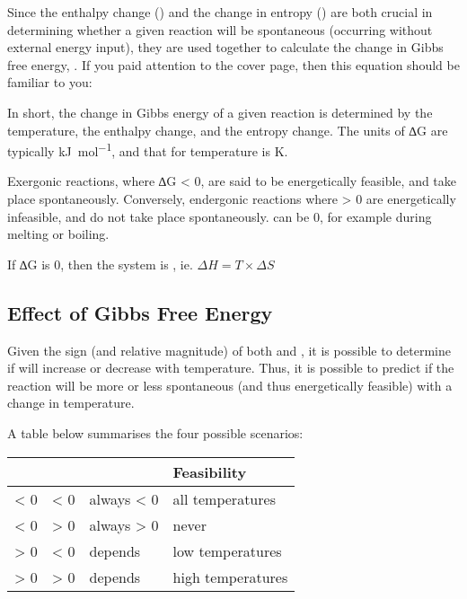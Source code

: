		Since the enthalpy change (\enth{}) and the change in entropy (\entr{}) are both crucial in determining whether a given reaction will
		be spontaneous (occurring without external energy input), they are used together to calculate the change in Gibbs free energy, \gibb{}.
		If you paid attention to the cover page, then this equation should be familiar to you:

		\mathdiagram{
			\[ \Delta G = \Delta H - T\times \Delta S \]
		}

		In short, the change in Gibbs energy of a given reaction is determined by the temperature, the enthalpy change, and the entropy change.
		The units of ∆G are typically \si{\kilo\joule\per\mole}, and that for temperature is \si{\kelvin}.

		Exergonic reactions, where ∆G < 0, are said to be energetically feasible, and take place spontaneously. Conversely, endergonic
		reactions where \gibb{} > 0 are energetically infeasible, and do not take place spontaneously. \gibb{} can be 0, for example during
		melting or boiling.

		If ∆G is 0, then the system is , ie. $\Delta H = T\times \Delta S$

		\subsection{Effect of Gibbs Free Energy}

			Given the sign (and relative magnitude) of both \enth{} and \entr{}, it is possible to determine if \gibb{} will increase or
			decrease with temperature. Thus, it is possible to predict if the reaction will be more or less spontaneous (and thus
			energetically feasible) with a change in temperature.

			A table below summarises the four possible scenarios:

			\begin{center}\begin{table}[htb]\renewcommand{\arraystretch}{1.5}
			\begin{tabu} to \textwidth {| X[c,m] | X[c,m] | X[c,m] | X[c,m] |}

				\hline		\enth{}		&	\entr{}		&	\gibb{}		&		Feasibility			\\

				\hline		< 0			&	< 0			&	always < 0	&		all temperatures	\\
				\hline		< 0			&	> 0			&	always > 0	&				never		\\
				\hline		> 0			&	< 0			&	depends		&		low temperatures	\\
				\hline		> 0			&	> 0			&	depends		&		high temperatures	\\
				\hline

			\end{tabu}
			\end{table}\end{center}\vspace{-10mm}

